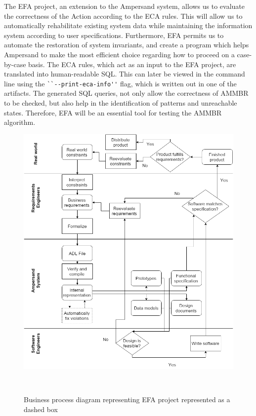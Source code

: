 The EFA project, an extension to the Ampersand system, allows us to evaluate 
the correctness of the Action according to the ECA rules. This will 
allow us to automatically rehabilitate existing system data while 
maintaining the information system according to user specifications. 
Furthermore, EFA permits us to automate the restoration of system invariants, 
and create a program which helps Ampersand to make the most efficient choice 
regarding how to proceed on a case-by-case basis. The ECA rules, which act as 
an 
input to the EFA project, are translated into human-readable SQL. This can 
later 
be viewed in the command line using the \verb|``--print-eca-info''| flag, which 
is written out in one of the artifacts. The generated SQL queries, not only 
allow  the correctness of AMMBR to be checked, but also help in the 
identification of patterns and unreachable states. Therefore, EFA will be an 
essential tool for testing the AMMBR algorithm.


\begin{figure}[!htb]
\begin{center}
\includegraphics[width=\textwidth]{../figures/business_process}
\caption{Business process diagram representing EFA project represented as a dashed box}~\label{fig:EFAproject}
\end{center}
\end{figure}


